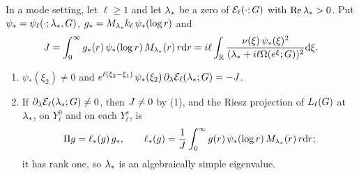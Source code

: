 \begin{theorem}
\label{thm:evans-simple}
In a mode setting, let $\ell\ge1$ and let $\lambda_*$ be a zero of
$\mathcal{E}_\ell(\cdot;G)$ with $\Re\lambda_*>0$. Put $\psi_*=\psi_\ell(\cdot;\lambda_*,G)$,
$g_*=M_{\lambda_*}k_\ell\,\psi_*(\log r)$ and
\[
J=\int_0^\infty g_*(r)\,\psi_*(\log r)\,M_{\lambda_*}(r)\,r\dd r
=i\ell\int_{\mathbb{R}}\frac{\nu(\xi)\,\psi_*(\xi)^2}{(\lambda_*+i\ell\Omega(e^\xi;G))^2}\dd\xi .
\]
\begin{enumerate}[label=\textup{(\arabic*)}]
\item $\psi_*(\xi_2)\ne0$ and
  $e^{\ell(\xi_2-\xi_1)}\,\psi_*(\xi_2)\,\partial_\lambda\mathcal{E}_\ell(\lambda_*;G)=-J$.
\item If $\partial_\lambda\mathcal{E}_\ell(\lambda_*;G)\ne0$, then $J\ne0$ by \textup{(1)},
  and the Riesz projection of $L_{\ell}(G)$ at $\lambda_*$, on $Y^0_\ell$ and on
  each $Y^s_\ell$, is
  \[
  \Pi g=\ell_*(g)\,g_*,\qquad
  \ell_*(g)=\frac1{J}\int_0^\infty g(r)\,\psi_*(\log r)\,M_{\lambda_*}(r)\,r\dd r ;
  \]
  it has rank one, so $\lambda_*$ is an algebraically simple eigenvalue.
\end{enumerate}
\end{theorem}
